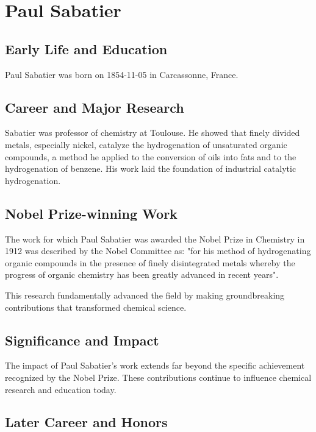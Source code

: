 \clearpage

\section{Paul Sabatier}

\subsection*{Early Life and Education}

Paul Sabatier was born on 1854-11-05 in Carcassonne, France.

\subsection*{Career and Major Research}

Sabatier was professor of chemistry at Toulouse. He showed that finely divided metals, especially nickel, catalyze the hydrogenation of unsaturated organic compounds, a method he applied to the conversion of oils into fats and to the hydrogenation of benzene. His work laid the foundation of industrial catalytic hydrogenation.

\subsection*{Nobel Prize-winning Work}

The work for which Paul Sabatier was awarded the Nobel Prize in Chemistry in 1912 was described by the Nobel Committee as: "for his method of hydrogenating organic compounds in the presence of finely disintegrated metals whereby the progress of organic chemistry has been greatly advanced in recent years".

This research fundamentally advanced the field by making groundbreaking contributions that transformed chemical science.

\subsection*{Significance and Impact}

The impact of Paul Sabatier's work extends far beyond the specific achievement recognized by the Nobel Prize.
These contributions continue to influence chemical research and education today.

\subsection*{Later Career and Honors}

